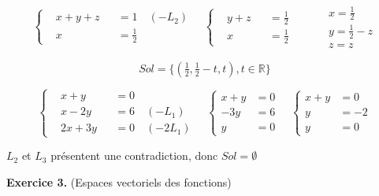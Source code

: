 \documentclass[a4paper, 10pt]{report}
\begin{document}
	\colorbox{solution}
	{
		\begin{minipage}{0.9\textwidth}
			\[
				\left\{
				\begin{aligned}
					&x + y + z &&= 1 \quad (-L_2)\\
					&x &&= \frac{1}{2}
				\end{aligned}
				\right.
				\quad
				\left\{
				\begin{aligned}
					&y + z &&= \frac{1}{2}\\
					&x &&= \frac{1}{2}
				\end{aligned}
				\right.
				\qquad
				\left.
				\begin{aligned}
					&x = \tfrac{1}{2}\\
					&y = \tfrac{1}{2} - z\\
					&z = z
				\end{aligned}
				\right.
			\]
			
			\[
				Sol =\{(\tfrac{1}{2}, \tfrac{1}{2} - t, t),
					t \in \mathbb{R}\}
			\]
			
			\vspace{5mm}
			
			\[
			\left\{
			\begin{aligned}
				&x + y &&= 0\\
				&x - 2y &&= 6 \quad (-L_1)\\
				&2x + 3y &&= 0 \quad (-2L_1)
			\end{aligned}
			\right.
			\quad
			\left\{
			\begin{aligned}
				x + y &= 0\\
				- 3y &= 6\\
				y &= 0
			\end{aligned}
			\right.
			\quad
			\left\{
			\begin{aligned}
				x + y &= 0\\
				y &= -2\\
				y &= 0
			\end{aligned}
			\right.
			\]
			
			\begin{center}
				$L_2$ et $L_3$ présentent une contradiction, donc
				$Sol =\emptyset$
			\end{center}
		\end{minipage}
	}
	
	\vspace{5mm}
	\noindent
	\textbf{Exercice 3.} (Espaces vectoriels des fonctions)
	
\end{document}
